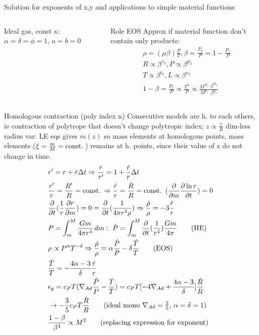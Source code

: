 \begin{frame}{Solution for exponents of x,y and applications to simple material functions}
\begin{columns}[T]
\begin{column}{0.38\textwidth}
\begin{block}{Ideal gas, const $\kappa$: $\alpha=\delta=\phi=1$, $a=b=0$}
        \end{block}
    \end{column}
    \begin{column}{0.32\textwidth}
        \begin{block}{Role EOS}
            Approx if material function don't contain only products:
            \begin{align*}
                &\rho=(\mu\beta)\frac{P}{T},\beta=\frac{P_g}{P}=1-\frac{P_r}{P}\\
                &R\propto\beta^{z_2},P\propto\beta^{p_2}\\
                &T\propto\beta^{t_2},L\propto\beta^{s_2}\tag{$\beta$ det. by $P,T$}\\
                &1-\beta=\frac{P_r}{P}\propto \frac{T^4}{P}\propto\frac{M^{4t_1}}{M^{p_1}}\frac{\beta^{4t_2}}{\beta^{p_2}}
            \end{align*}
        \end{block}
    \end{column}
\end{columns}

\end{frame}

\begin{frame}{Homologous contraction (poly index n)}
    Consecutive models are h. to each others, ie contraction of polytrope that doesn't change polytropic index; $z\propto\frac{r}{R}$ dim-less radius var: LE eqs gives $m(z)$ so mass elements at homologous points, mass elements ($\xi=\frac{m}{M}=\operatorname{const.}{}$) remains at h. points, since their value of z do not change in time.
\begin{align*}
&r'=r+\dot{r}\Delta t\Rightarrow\frac{r}{r'}=1+\frac{\dot{r}}{r}\Delta t\\
&\frac{r'}{r}=\frac{R'}{R}=\const{}\Rightarrow\frac{\dot{r}}{r}=\frac{\dot{R}}{R}=\const{}\ (\PDof{m}\PDy{t}{\ln{r}})=0\\
&\PDof{t}(\frac{1}{r}\PDy{m}{r})=0=\PDof{t}(\frac{1}{4\pi r^3\rho})\Rightarrow\frac{\dot{\rho}}{\rho}=-3\frac{\dot{r}}{r}\\
&P=\int_m^M\frac{Gm}{4\pi r^4}\,dm:\ \dot{P}=\int_m^M\PDof{t}(\frac{1}{r^4})\frac{Gm}{4\pi}\tag{HE}\\
&\rho\propto P^{\alpha}T^{-\delta}\Rightarrow\frac{\dot{\rho}}{\rho}=\alpha\frac{\dot{P}}{P}-\delta\frac{\dot{T}}{T}\tag{EOS}\\
&\frac{\dot{T}}{T}=-\frac{4\alpha-3}{\delta}\frac{\dot{r}}{r}\\
&\epsilon_g=c_PT(\nad\frac{\dot{P}}{P}-\frac{\dot{T}}{T})=c_PT[-4\nad+\frac{4\alpha-3}{\delta}]\frac{\dot{R}}{R}\\
&\to-\frac{3}{5}c_PT\frac{\dot{R}}{R}\tag{ideal mono $\nad=\frac{2}{5}$, $\alpha=\delta=1$}\\
&\frac{1-\beta}{\beta^4}\propto M^2\tag{replacing expression for exponent}
\end{align*}
\end{frame}


